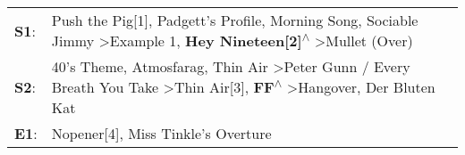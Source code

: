 \begin{supertabular}{p{0.03\textwidth}p{0.92\textwidth}}
 \textbf{S1}:  &                                             Push the Pig[1]\textsuperscript{}, \enspace Padgett's Profile\textsuperscript{}, \enspace Morning Song\textsuperscript{}, \enspace Sociable Jimmy\textsuperscript{} \textgreater \enspace Example 1\textsuperscript{}, \enspace \textbf{Hey Nineteen[2]\textsuperscript{$\wedge$}} \textgreater \enspace Mullet (Over)\textsuperscript{}  \enspace  \\
 \textbf{S2}:  &  40's Theme\textsuperscript{}, \enspace Atmosfarag\textsuperscript{}, \enspace Thin Air\textsuperscript{} \textgreater \enspace Peter Gunn / Every Breath You Take\textsuperscript{} \textgreater \enspace Thin Air[3]\textsuperscript{}, \enspace \textbf{FF\textsuperscript{$\wedge$}} \textgreater \enspace Hangover\textsuperscript{}, \enspace Der Bluten Kat\textsuperscript{}  \enspace  \\
 \textbf{E1}:  &                                                                                                                                                                                                                                                                                                      Nopener[4]\textsuperscript{}, \enspace Miss Tinkle's Overture\textsuperscript{}  \enspace  \\
\end{supertabular}
